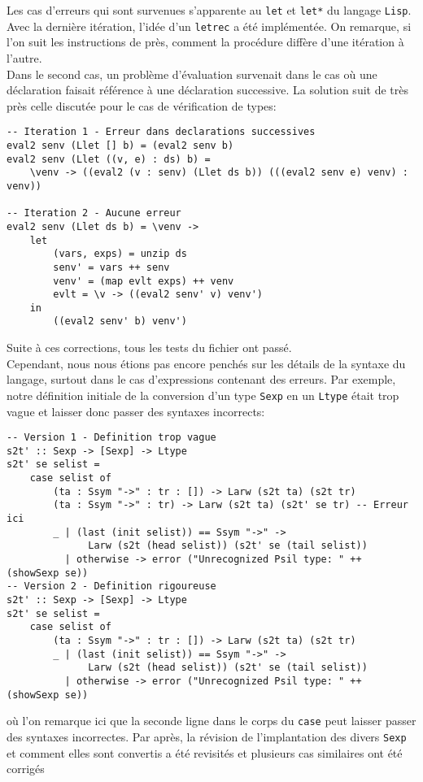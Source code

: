 \documentclass[10pt, titlepage]{article}
\begin{document}
Les cas d'erreurs qui sont survenues s'apparente au \texttt{let} et
\texttt{let*} du langage \texttt{Lisp}. Avec la dernière itération, l'idée d'un
\texttt{letrec} a été implémentée. On remarque, si l'on suit les instructions
de près, comment la procédure diffère d'une itération à l'autre. \\

Dans le second cas, un problème d'évaluation survenait dans le cas où une
déclaration faisait référence à une déclaration successive. La solution suit de
très près celle discutée pour le cas de vérification de types:

\begin{lstlisting}
-- Iteration 1 - Erreur dans declarations successives
eval2 senv (Llet [] b) = (eval2 senv b)
eval2 senv (Llet ((v, e) : ds) b) =
    \venv -> ((eval2 (v : senv) (Llet ds b)) (((eval2 senv e) venv) : venv))

-- Iteration 2 - Aucune erreur
eval2 senv (Llet ds b) = \venv ->
    let
        (vars, exps) = unzip ds
        senv' = vars ++ senv
        venv' = (map evlt exps) ++ venv
        evlt = \v -> ((eval2 senv' v) venv')
    in
        ((eval2 senv' b) venv')
\end{lstlisting}

Suite à ces corrections, tous les tests du fichier ont passé. \\

Cependant, nous nous étions pas encore penchés sur les détails de la syntaxe du
langage, surtout dans le cas d'expressions contenant des erreurs. Par exemple,
notre définition initiale de la conversion d'un type \texttt{Sexp} en un
\texttt{Ltype} était trop vague et laisser donc passer des syntaxes incorrects:
\begin{lstlisting}
-- Version 1 - Definition trop vague
s2t' :: Sexp -> [Sexp] -> Ltype
s2t' se selist =
    case selist of
        (ta : Ssym "->" : tr : []) -> Larw (s2t ta) (s2t tr)
        (ta : Ssym "->" : tr) -> Larw (s2t ta) (s2t' se tr) -- Erreur ici
        _ | (last (init selist)) == Ssym "->" ->
              Larw (s2t (head selist)) (s2t' se (tail selist))
          | otherwise -> error ("Unrecognized Psil type: " ++ (showSexp se))
-- Version 2 - Definition rigoureuse
s2t' :: Sexp -> [Sexp] -> Ltype
s2t' se selist =
    case selist of
        (ta : Ssym "->" : tr : []) -> Larw (s2t ta) (s2t tr)
        _ | (last (init selist)) == Ssym "->" ->
              Larw (s2t (head selist)) (s2t' se (tail selist))
          | otherwise -> error ("Unrecognized Psil type: " ++ (showSexp se))
\end{lstlisting}
où l'on remarque ici que la seconde ligne dans le corps du \texttt{case} peut
laisser passer des syntaxes incorrectes. Par après, la révision de
l'implantation des divers \texttt{Sexp} et comment elles sont convertis a été
revisités et plusieurs cas similaires ont été corrigés
\end{document}
